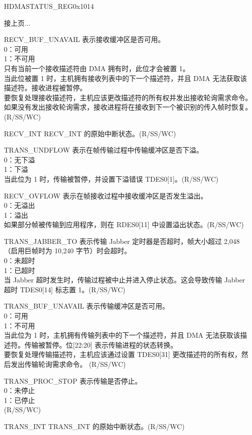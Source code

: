\addtocounter{Regfloat}{-1}
\begin{register}{H}{DMASTATUS\_REG}{0x1014}
\begin{regdesc}\begin{reglist}\item [接上页...]


\item [RECV\_BUF\_UNAVAIL] 表示接收缓冲区是否可用。\\
0：可用\\
1：不可用\\
只有当前一个接收描述符由 DMA 拥有时，此位才会被置 1。\\
当此位被置 1 时，主机拥有接收列表中的下一个描述符，并且 DMA 无法获取该描述符。接收进程被暂停。\\
要恢复处理接收描述符，主机应该更改描述符的所有权并发出接收轮询需求命令。如果没有发出接收轮询需求，接收进程将在接收到下一个被识别的传入帧时恢复。 (R/SS/WC)
\item [RECV\_INT] RECV\_INT 的原始中断状态。(R/SS/WC)
\item [TRANS\_UNDFLOW] 表示在帧传输过程中传输缓冲区是否下溢。\\
0：无下溢\\
1：下溢\\
当此位为 1 时，传输被暂停，并设置下溢错误 TDES0[1]。(R/SS/WC)
\item [RECV\_OVFLOW] 表示在帧接收过程中接收缓冲区是否发生溢出。\\
0：无溢出\\
1：溢出\\
如果部分帧被传输到应用程序，则在 RDES0[11] 中设置溢出状态。(R/SS/WC)
\item [TRANS\_JABBER\_TO] 表示传输 Jabber 定时器是否超时，帧大小超过 2,048（启用巨帧时为 10,240 字节）时会超时。\\
0：未超时\\
1：已超时\\
当 Jabber 超时发生时，传输过程被中止并进入停止状态。这会导致传输 Jabber 超时 TDES0[14] 标志置 1。(R/SS/WC)
\item [TRANS\_BUF\_UNAVAIL] 表示传输缓冲区是否可用。\\
0：可用\\
1：不可用\\
当此位为 1 时，主机拥有传输列表中的下一个描述符，并且 DMA 无法获取该描述符。传输被暂停。位[22:20] 表示传输进程的状态转换。\\
要恢复处理传输描述符，主机应该通过设置 TDES0[31] 更改描述符的所有权，然后发出传输轮询需求命令。 (R/SS/WC)
\item [TRANS\_PROC\_STOP] 表示传输是否停止。\\
0：未停止\\
1：已停止\\(R/SS/WC)
\item [TRANS\_INT] TRANS\_INT 的原始中断状态。(R/SS/WC)
\end{reglist}\end{regdesc}
\end{register}



